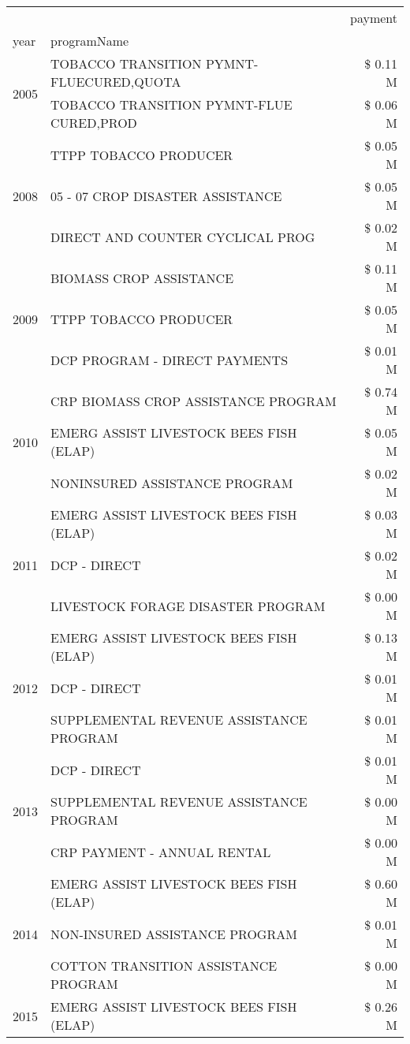 \begin{tabular}{llr}
\toprule
 &  & payment \\
year & programName &  \\
\midrule
\multirow[t]{2}{*}{2005} & TOBACCO TRANSITION PYMNT-FLUECURED,QUOTA & \$ 0.11 M \\
 & TOBACCO TRANSITION PYMNT-FLUE CURED,PROD & \$ 0.06 M \\
\cline{1-3}
\multirow[t]{3}{*}{2008} & TTPP TOBACCO PRODUCER & \$ 0.05 M \\
 & 05 - 07 CROP DISASTER ASSISTANCE & \$ 0.05 M \\
 & DIRECT AND COUNTER CYCLICAL PROG & \$ 0.02 M \\
\cline{1-3}
\multirow[t]{3}{*}{2009} & BIOMASS CROP ASSISTANCE & \$ 0.11 M \\
 & TTPP TOBACCO PRODUCER & \$ 0.05 M \\
 & DCP PROGRAM - DIRECT PAYMENTS & \$ 0.01 M \\
\cline{1-3}
\multirow[t]{3}{*}{2010} & CRP BIOMASS CROP ASSISTANCE PROGRAM & \$ 0.74 M \\
 & EMERG ASSIST LIVESTOCK BEES FISH (ELAP) & \$ 0.05 M \\
 & NONINSURED ASSISTANCE PROGRAM & \$ 0.02 M \\
\cline{1-3}
\multirow[t]{3}{*}{2011} & EMERG ASSIST LIVESTOCK BEES FISH (ELAP) & \$ 0.03 M \\
 & DCP - DIRECT & \$ 0.02 M \\
 & LIVESTOCK FORAGE DISASTER PROGRAM & \$ 0.00 M \\
\cline{1-3}
\multirow[t]{3}{*}{2012} & EMERG ASSIST LIVESTOCK BEES FISH (ELAP) & \$ 0.13 M \\
 & DCP - DIRECT & \$ 0.01 M \\
 & SUPPLEMENTAL REVENUE ASSISTANCE PROGRAM & \$ 0.01 M \\
\cline{1-3}
\multirow[t]{3}{*}{2013} & DCP - DIRECT & \$ 0.01 M \\
 & SUPPLEMENTAL REVENUE ASSISTANCE PROGRAM & \$ 0.00 M \\
 & CRP PAYMENT - ANNUAL RENTAL & \$ 0.00 M \\
\cline{1-3}
\multirow[t]{3}{*}{2014} & EMERG ASSIST LIVESTOCK BEES FISH (ELAP) & \$ 0.60 M \\
 & NON-INSURED ASSISTANCE PROGRAM & \$ 0.01 M \\
 & COTTON TRANSITION ASSISTANCE PROGRAM & \$ 0.00 M \\
\cline{1-3}
\multirow[t]{3}{*}{2015} & EMERG ASSIST LIVESTOCK BEES FISH (ELAP) & \$ 0.26 M \\

\end{tabular}
